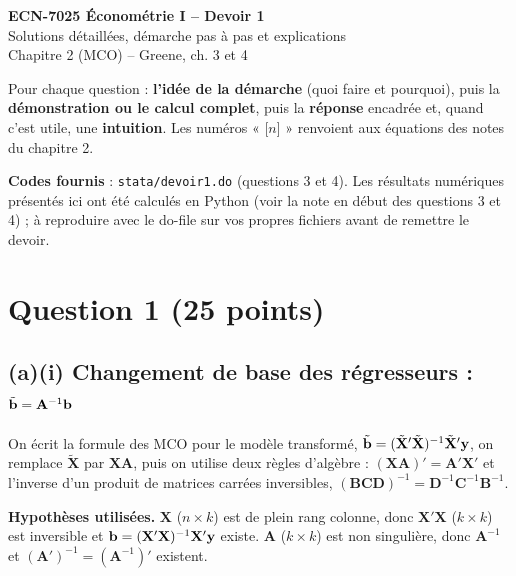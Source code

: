 \documentclass[11pt,a4paper]{article}
\newcommand{\vy}{\mathbf{y}}\newcommand{\vX}{\mathbf{X}}\newcommand{\vZ}{\mathbf{Z}}
\newcommand{\A}{\mathbf{A}}\newcommand{\I}{\mathbf{I}}
\newcommand{\tX}{\tilde{\mathbf{X}}}
\begin{document}
\begin{center}
{\LARGE\bfseries ECN-7025 Économétrie I -- Devoir 1}\\[4pt]
{\large Solutions détaillées, démarche pas à pas et explications}\\[4pt]
{\small Chapitre 2 (MCO) -- Greene, ch. 3 et 4}
\end{center}

\begin{tcolorbox}[colback=white,colframe=NavyBlue,title=Comment lire ce document]
Pour chaque question : \textbf{l'idée de la démarche} (quoi faire et pourquoi), puis la \textbf{démonstration ou le calcul complet}, puis la \textbf{réponse} encadrée et, quand c'est utile, une \textbf{intuition}.
Les numéros « [$n$] » renvoient aux équations des notes du chapitre 2.

\textbf{Codes fournis} : \texttt{stata/devoir1.do} (questions 3 et 4). Les résultats numériques présentés ici ont été calculés en Python (voir la note en début des questions 3 et 4) ; à reproduire avec le do-file sur vos propres fichiers avant de remettre le devoir.
\end{tcolorbox}

\tableofcontents

\section{Question 1 (25 points)}

\subsection{(a)(i) Changement de base des régresseurs : $\tilde{\vb}=\A^{-1}\vb$}

\begin{idee}
On écrit la formule des MCO pour le modèle transformé, $\tilde{\vb}=(\tX'\tX)^{-1}\tX'\vy$, on remplace $\tX$ par $\vX\A$, puis on utilise deux règles d'algèbre : $(\vX\A)'=\A'\vX'$ et l'inverse d'un produit de matrices carrées inversibles, $(\mathbf{BCD})^{-1}=\mathbf{D}^{-1}\mathbf{C}^{-1}\mathbf{B}^{-1}$.
\end{idee}

\textbf{Hypothèses utilisées.} $\vX$ ($n\times k$) est de plein rang colonne, donc $\vX'\vX$ ($k\times k$) est inversible et $\vb=(\vX'\vX)^{-1}\vX'\vy$ existe. $\A$ ($k\times k$) est non singulière, donc $\A^{-1}$ et $(\A')^{-1}=(\A^{-1})'$ existent.
\end{document}
